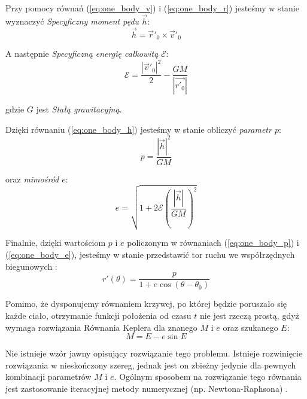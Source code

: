 \documentclass{article}
\begin{document}
Przy pomocy równań (\ref{eq:one_body_v}) i (\ref{eq:one_body_r}) jesteśmy w stanie wyznaczyć \textit{Specyficzny moment pędu} $\vec{h}$:
\begin{equation}
    \vec{h} = \vec{r}'_0 \times \vec{v}'_0
\label{eq:one_body_h}
\end{equation}

A następnie \textit{Specyficzną energię całkowitą} $\mathcal{E}$:
\begin{equation}
    \mathcal{E} = \frac{ |\vec{v}'_0|^2 }{2}
    - \frac{GM}{ |\vec{r'_0}| }
\label{eq:one_body_energy}
\end{equation}

gdzie $G$ jest \textit{Stałą grawitacyjną}.

Dzięki równaniu (\ref{eq:one_body_h}) jesteśmy w stanie obliczyć \textit{parametr $p$}:
\begin{equation}
    p = \frac{ |\vec{h}|^2 }{GM}
\label{eq:one_body_p}
\end{equation}

oraz \textit{mimośród $e$}:
\begin{equation}
    e = \sqrt{
        1 + 2\mathcal{E} \left(
            \frac{ |\vec{h}| }{ GM }
        \right)^2
    }
\label{eq:one_body_e}
\end{equation}

Finalnie, dzięki wartościom $p$ i $e$ policzonym w równaniach (\ref{eq:one_body_p}) i (\ref{eq:one_body_e}), jesteśmy w stanie przedstawić tor ruchu we współrzędnych biegunowych \cite{bate71_ch1}:
\begin{equation}
    r'(\theta) = \frac{p}{ 1 + e \cos{( \theta - \theta_0 )} }
\label{eq:one_body_trajectory}
\end{equation}

Pomimo, że dysponujemy równaniem krzywej, po której będzie poruszało się każde ciało, otrzymanie funkcji położenia od czasu $t$ nie jest rzeczą prostą, gdyż wymaga rozwiązania Równania Keplera dla znanego $M$ i $e$ oraz szukanego $E$:
\begin{displaymath}
    M = E - e \sin{E}
\end{displaymath}

Nie istnieje wzór jawny opisujący rozwiązanie tego problemu. Istnieje rozwinięcie rozwiązania w nieskończony szereg, jednak jest on zbieżny jedynie dla pewnych kombinacji parametrów $M$ i $e$. Ogólnym sposobem na rozwiązanie tego równania jest zastosowanie iteracyjnej metody numerycznej (np. Newtona-Raphsona) \cite{solvingKepler1986}.
\end{document}
